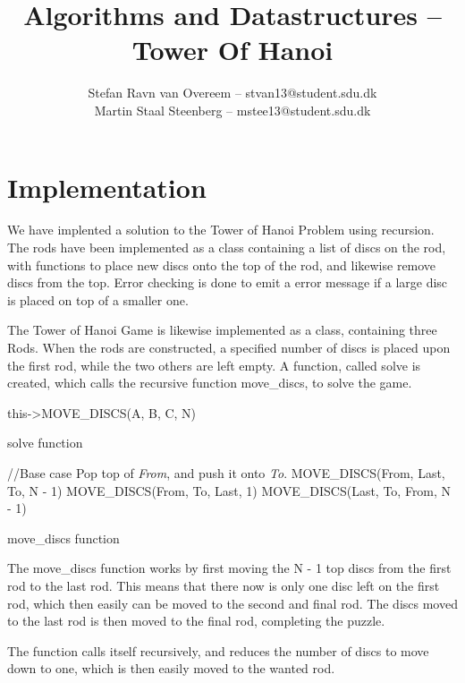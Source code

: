 \documentclass[a4paper,12pt,danish]{article}
\title{\textbf{Algorithms and Datastructures -- Tower Of Hanoi}}
\author{Stefan Ravn van Overeem – stvan13@student.sdu.dk \\
		Martin Staal Steenberg – mstee13@student.sdu.dk}
\begin{document}
\maketitle
\section{Implementation}
	We have implented a solution to the Tower of Hanoi Problem using recursion.
	The rods have been implemented as a class containing a list of discs on the rod, with functions to place new discs onto the top of the rod, and likewise remove discs from the top. Error checking is done to emit a error message if a large disc is placed on top of a smaller one.
	
	The Tower of Hanoi Game is likewise implemented as a class, containing three Rods.
	When the rods are constructed, a specified number of discs is placed upon the first rod, while the two others are left empty.
	A function, called solve is created, which calls the recursive function move\_discs, to solve the game.

\begin{algorithm}[H]
	\begin{algorithmic}[1]
		\State this->MOVE\_DISCS(A, B, C, N)
		\EndProcedure
	\end{algorithmic}
	\caption{solve function}
\end{algorithm}


\begin{algorithm}[H]
	\begin{algorithmic}[1]
		 //Base case
		\State Pop top of \textit{From}, and push it onto \textit{To}.
		\State \Return
		\EndIf
		\State MOVE\_DISCS(From, Last, To, N - 1)
		\State MOVE\_DISCS(From, To, Last, 1)
		\State MOVE\_DISCS(Last, To, From, N - 1)
		\EndProcedure
	\end{algorithmic}
	\caption{move\_discs function}
\end{algorithm}
\newpage

The move\_discs function works by first moving the N - 1 top discs from the first rod to the last rod. This means that there now is only one disc left on the first rod, which then easily can be moved to the second and final rod. The discs moved to the last rod is then moved to the final rod, completing the puzzle.

The function calls itself recursively, and reduces the number of discs to move down to one, which is then easily moved to the wanted rod.
\end{document}

